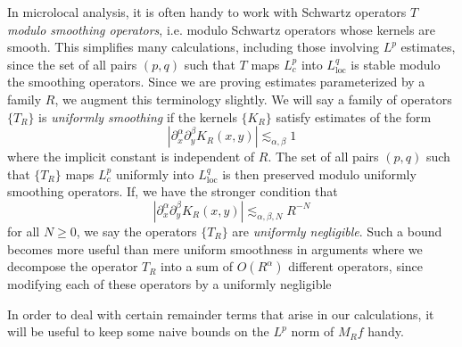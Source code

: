 In microlocal analysis, it is often handy to work with Schwartz operators $T$ \emph{modulo smoothing operators}, i.e. modulo Schwartz operators whose kernels are smooth. This simplifies many calculations, including those involving $L^p$ estimates, since the set of all pairs $(p,q)$ such that $T$ maps $L^p_c$ into $L^q_{\text{loc}}$ is stable modulo the smoothing operators. Since we are proving estimates parameterized by a family $R$, we augment this terminology slightly. We will say a family of operators $\{ T_R \}$ is \emph{uniformly smoothing} if the kernels $\{ K_R \}$ satisfy estimates of the form
%
\[ |\partial_x^\alpha \partial_y^\beta K_R(x,y)| \lesssim_{\alpha,\beta} 1 \]
%
where the implicit constant is independent of $R$. The set of all pairs $(p,q)$ such that $\{ T_R \}$ maps $L^p_c$ uniformly into $L^q_{\text{loc}}$ is then preserved modulo uniformly smoothing operators. If, we have the stronger condition that
%
\[ |\partial_x^\alpha \partial_y^\beta K_R(x,y)| \lesssim_{\alpha,\beta,N} R^{-N} \]
%
for all $N \geq 0$, we say the operators $\{ T_R \}$ are \emph{uniformly negligible}. Such a bound becomes more useful than mere uniform smoothness in arguments where we decompose the operator $T_R$ into a sum of $O(R^\alpha)$ different operators, since modifying each of these operators by a uniformly negligible 

In order to deal with certain remainder terms that arise in our calculations, it will be useful to keep some naive bounds on the $L^p$ norm of $M_R f$ handy.

